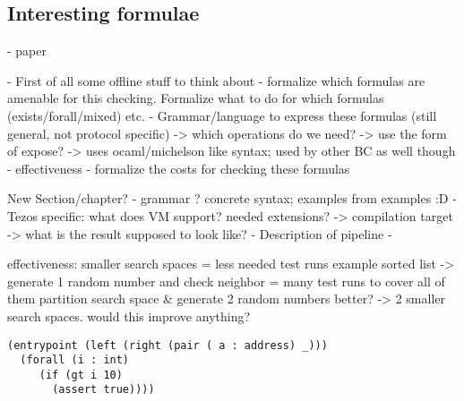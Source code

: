 \subsection{Interesting formulae}\label{sec:example_formulae}
- paper


- First of all some offline stuff to think about - formalize which formulas are amenable for this checking. Formalize what to do for which formulas (exists/forall/mixed) etc.
- Grammar/language to express these formulas (still general, not protocol specific)
	-> which operations do we need?
	-> use the form of expose?
	-> uses ocaml/michelson like syntax; used by other BC as well though
- effectiveness
- formalize the costs for checking these formulas



New Section/chapter? %
- grammar ? concrete syntax; examples from examples :D
- Tezos specific: what does VM support? needed extensions?
	-> compilation target -> what is the result supposed to look like?
- Description of pipeline
- 



effectiveness:
smaller search spaces = less needed test runs
example sorted list -> generate 1 random number and check neighbor = many test runs to cover all of them
partition search space \& generate 2 random numbers better? -> 2 smaller search spaces. would this improve anything?



\begin{lstlisting}[numbers=none, language=Assertion]
(entrypoint (left (right (pair ( a : address) _)))
  (forall (i : int)
     (if (gt i 10)
       (assert true))))
\end{lstlisting}